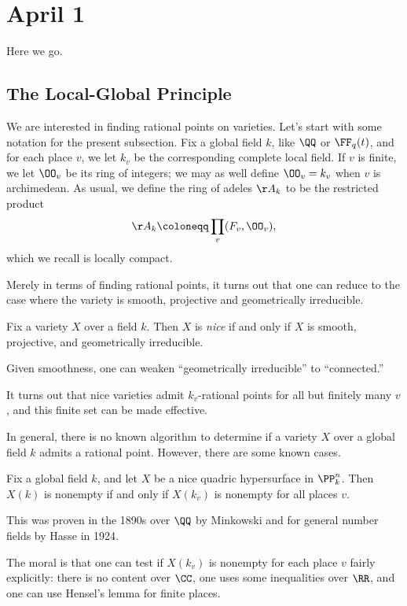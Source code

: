 \documentclass[../notes.tex]{subfiles}
\begin{document}
\section{April 1}
Here we go.

\subsection{The Local-Global Principle}
We are interested in finding rational points on varieties. Let's start with some notation for the present subsection. Fix a global field $k$, like $\QQ$ or $\FF_q(t)$, and for each place $v$, we let $k_v$ be the corresponding complete local field. If $v$ is finite, we let $\OO_v$ be its ring of integers; we may as well define $\OO_v=k_v$ when $v$ is archimedean. As usual, we define the ring of adeles $\AA_k$ to be the restricted product
\[\AA_k\coloneqq\prod_v(F_v,\OO_v),\]
which we recall is locally compact.

Merely in terms of finding rational points, it turns out that one can reduce to the case where the variety is smooth, projective and geometrically irreducible.
\begin{definition}[nice]
	Fix a variety $X$ over a field $k$. Then $X$ is \textit{nice} if and only if $X$ is smooth, projective, and geometrically irreducible.
\end{definition}
\begin{remark}
	Given smoothness, one can weaken ``geometrically irreducible'' to ``connected.''
\end{remark}
\begin{remark}
	It turns out that nice varieties admit $k_v$-rational points for all but finitely many $v$, and this finite set can be made effective.
\end{remark}
In general, there is no known algorithm to determine if a variety $X$ over a global field $k$ admits a rational point. However, there are some known cases.
\begin{theorem} \label{thm:hasse-minkowski}
	Fix a global field $k$, and let $X$ be a nice quadric hypersurface in $\PP^n_k$. Then $X(k)$ is nonempty if and only if $X(k_v)$ is nonempty for all places $v$.
\end{theorem}
\begin{remark}
	This was proven in the 1890s over $\QQ$ by Minkowski and for general number fields by Hasse in 1924.
\end{remark}
The moral is that one can test if $X(k_v)$ is nonempty for each place $v$ fairly explicitly: there is no content over $\CC$, one uses some inequalities over $\RR$, and one can use Hensel's lemma for finite places.
\end{document}
